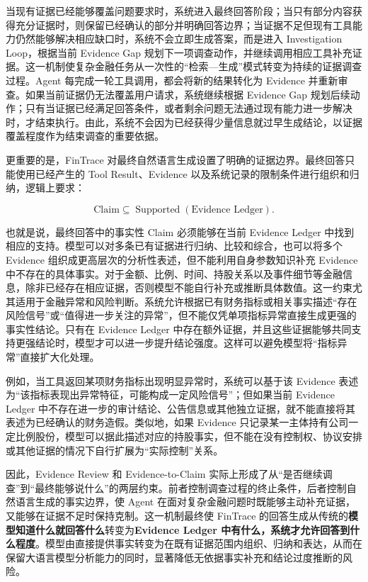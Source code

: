当现有证据已经能够覆盖问题要求时，系统进入最终回答阶段；当只有部分内容获得充分证据时，则保留已经确认的部分并明确回答边界；当证据不足但现有工具能力仍然能够解决相应缺口时，系统不会立即生成答案，而是进入 Investigation Loop，根据当前 Evidence Gap 规划下一项调查动作，并继续调用相应工具补充证据。这一机制使复杂金融任务从一次性的“检索—生成”模式转变为持续的证据调查过程。Agent 每完成一轮工具调用，都会将新的结果转化为 Evidence 并重新审查。如果当前证据仍无法覆盖用户请求，系统继续根据 Evidence Gap 规划后续动作；只有当证据已经满足回答条件，或者剩余问题无法通过现有能力进一步解决时，才结束执行。由此，系统不会因为已经获得少量信息就过早生成结论，以证据覆盖程度作为结束调查的重要依据。

更重要的是，FinTrace 对最终自然语言生成设置了明确的证据边界。最终回答只能使用已经产生的 Tool Result、Evidence 以及系统记录的限制条件进行组织和归纳，逻辑上要求：

\[
\mathrm{Claim}\subseteq
\operatorname{Supported}\!\left(\text{Evidence Ledger}\right).
\]

也就是说，最终回答中的事实性 Claim 必须能够在当前 Evidence Ledger 中找到相应的支持。模型可以对多条已有证据进行归纳、比较和综合，也可以将多个 Evidence 组织成更高层次的分析性表述，但不能利用自身参数知识补充 Evidence 中不存在的具体事实。对于金额、比例、时间、持股关系以及事件细节等金融信息，除非已经存在相应证据，否则模型不能自行补充或推断具体数值。这一约束尤其适用于金融异常和风险判断。系统允许根据已有财务指标或相关事实描述“存在风险信号”或“值得进一步关注的异常”，但不能仅凭单项指标异常直接生成更强的事实性结论。只有在 Evidence Ledger 中存在额外证据，并且这些证据能够共同支持更强结论时，模型才可以进一步提升结论强度。这样可以避免模型将“指标异常”直接扩大化处理。

例如，当工具返回某项财务指标出现明显异常时，系统可以基于该 Evidence 表述为“该指标表现出异常特征，可能构成一定风险信号”；但如果当前 Evidence Ledger 中不存在进一步的审计结论、公告信息或其他独立证据，就不能直接将其表述为已经确认的财务造假。类似地，如果 Evidence 只记录某一主体持有公司一定比例股份，模型可以据此描述对应的持股事实，但不能在没有控制权、协议安排或其他证据的情况下自行扩展为“实际控制”关系。

因此，Evidence Review 和 Evidence-to-Claim 实际上形成了从“是否继续调查”到“最终能够说什么”的两层约束。前者控制调查过程的终止条件，后者控制自然语言生成的事实边界，使 Agent 在面对复杂金融问题时既能够主动补充证据，又能够在证据不足时保持克制。这一机制最终使 FinTrace 的回答生成从传统的\textbf{模型知道什么就回答什么}转变为\textbf{Evidence Ledger 中有什么，系统才允许回答到什么程度}。模型由直接提供事实转变为在既有证据范围内组织、归纳和表达，从而在保留大语言模型分析能力的同时，显著降低无依据事实补充和结论过度推断的风险。

